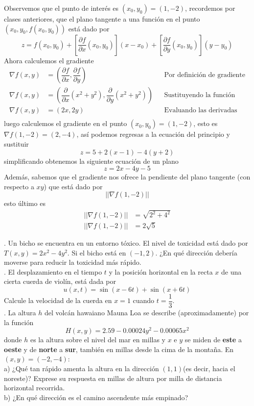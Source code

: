 \documentclass[letterpaper]{article}
\renewcommand{\d}{\partial}
\providecommand{\norm}[1]{\left|\left|#1\right|\right|}
\renewcommand{\*}{\cdot}
\theoremstyle{definition}
\begin{document}
Observemos que el punto de interés es $ (x_0, y_0) = (1,-2) $, recordemos por clases anteriores, que el plano tangente a una función en el punto $ (x_0, y_0, f(x_0,y_0)) $ está dado por
\[ z = f(x_0, y_0) + \left[ \dfrac{\d f}{\d x}(x_0,y_0) \right] (x - x_0) + \left[ \dfrac{\d f}{\d y}(x_0, y_0)\right](y - y_0) \]
Ahora calculemos el gradiente
\begin{align*}
	\nabla f(x,y) &= \left( \dfrac{\d f}{\d x},\dfrac{\d f}{\d y} \right) && \text{Por definición de gradiente}\\
	\nabla f(x,y) &= \left( \dfrac{\d }{\d x} (x^2 + y^2),\dfrac{\d}{\d y} (x^2 + y^2) \right) && \text{Sustituyendo la función }\\
	\nabla f(x,y) &= \left( 2x, 2y \right) && \text{Evaluando las derivadas}\\
\end{align*}
luego calculemos el gradiente en el punto $(x_0, y_0) = (1,-2) $, esto es $ \nabla f(1,-2) = (2,-4) $, así podemos regresas a la ecuación del principio y sustituir
\[ z = 5+ 2(x - 1) - 4(y+2) \]
simplificando obtenemos la siguiente ecuación de un plano
\[ z = 2x -4y -5 \]
Además, sabemos que el gradiente nos ofrece la pendiente del plano tangente (con respecto a $ xy $) que está dado por $$ \norm{\nabla f(1,-2)} $$esto último es 
\begin{align*}
	\norm{\nabla f(1,-2)} &= \sqrt{2^2 + 4^2}\\
	\norm{\nabla f(1,-2)} &= 2\sqrt{5}
\end{align*}


. Un bicho se encuentra en un entorno tóxico. El nivel de toxicidad está dado por $ T(x,y) = 2x^2 - 4y^2 $. Si el bicho está en $ (-1,2) $. ¿En qué dirección debería moverse para reducir la toxicidad más rápido.\\

. El desplazamiento en el tiempo $ t $ y la posición horizontal en la recta $ x $ de una cierta cuerda de violín, está dada por $$ u(x,t) = \sin(x - 6t) + \sin(x+6t) $$ Calcule la velocidad de la cuerda en $ x = 1 $ cuando $ t = \dfrac{1}{3} $.\\

. La altura $ h $ del volcán hawaiano Mauna Loa se describe (aproximadamente) por la función $$ H(x,y) = 2.59 - 0.00024y^2 - 0.00065x^2 $$donde $ h $ es la altura sobre el nivel del mar en millas y $ x $ e $ y $ se miden de \textbf{este} a \textbf{oeste} y de \textbf{norte} a \textbf{sur}, también en millas desde la cima de la montaña. En $ (x,y) = (-2,-4) $:\\

a) ¿Qué tan rápido amenta la altura en la dirección $ (1,1) $(es decir, hacia el noreste)? Exprese su respuesta en millas de altura por milla de distancia horizontal recorrida.\\

b) ¿En qué dirección es el camino ascendente más empinado?
\end{document}
